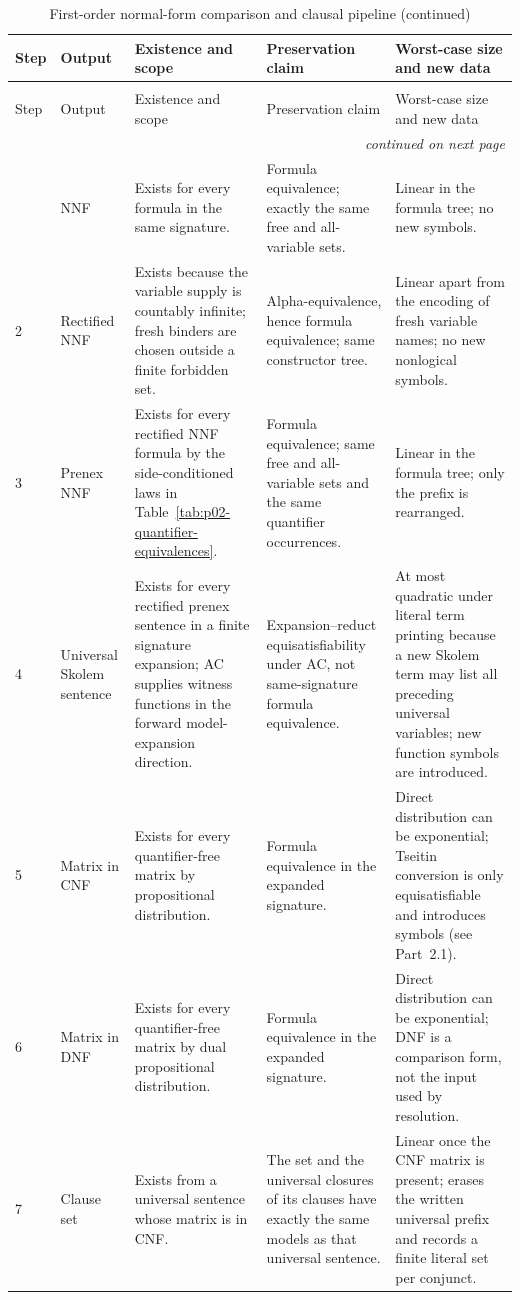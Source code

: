 \begin{landscape}
\begingroup\scriptsize\setlength{\tabcolsep}{3pt}
\begin{longtable}{@{}p{.30in}p{1.05in}p{1.65in}p{1.90in}p{2.00in}@{}}
\caption{First-order normal-form comparison and clausal pipeline.}
\label{tab:p02-fol-normal-form-pipeline}\\
\toprule
Step & Output & Existence and scope & Preservation claim & Worst-case size and new data \\ \midrule
\endfirsthead
\caption[]{First-order normal-form comparison and clausal pipeline (continued)}\\
\toprule Step & Output & Existence and scope & Preservation claim & Worst-case size and new data \\ \midrule
\endhead
\midrule\multicolumn{5}{r}{\emph{continued on next page}}\\
\endfoot
\endlastfoot
1 & NNF & Exists for every formula in the same signature. & Formula
equivalence; exactly the same free and all-variable sets. & Linear in the
formula tree; no new symbols. \\
2 & Rectified NNF & Exists because the variable supply is countably infinite;
fresh binders are chosen outside a finite forbidden set. & Alpha-equivalence,
hence formula equivalence; same constructor tree. & Linear apart from the
encoding of fresh variable names; no new nonlogical symbols. \\
3 & Prenex NNF & Exists for every rectified NNF formula by the side-conditioned
laws in Table~\ref{tab:p02-quantifier-equivalences}. & Formula equivalence;
same free and all-variable sets and the same quantifier occurrences. & Linear
in the formula tree; only the prefix is rearranged. \\
4 & Universal Skolem sentence & Exists for every rectified prenex sentence in a
finite signature expansion; AC supplies witness functions in the forward
model-expansion direction. & Expansion--reduct equisatisfiability under AC,
not same-signature formula equivalence. & At most quadratic under literal term
printing because a new Skolem term may list all preceding universal variables;
new function symbols are introduced. \\
5 & Matrix in CNF & Exists for every quantifier-free matrix by propositional
distribution. & Formula equivalence in the expanded signature. & Direct
distribution can be exponential; Tseitin conversion is only equisatisfiable
and introduces symbols (see Part~2.1). \\
6 & Matrix in DNF & Exists for every quantifier-free matrix by dual
propositional distribution. & Formula equivalence in the expanded signature. &
Direct distribution can be exponential; DNF is a comparison form, not the
input used by resolution. \\
7 & Clause set & Exists from a universal sentence whose matrix is in CNF. & The
set and the universal closures of its clauses have exactly the same models as
that universal sentence. & Linear once the CNF matrix is present; erases the
written universal prefix and records a finite literal set per conjunct. \\
\bottomrule
\end{longtable}
\endgroup
\end{landscape}

